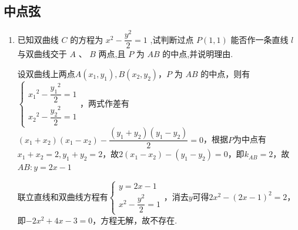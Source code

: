 \subsection*{中点弦}
\begin{enumerate}
    \item 已知双曲线 ${C}$ 的方程为 ${x}^{2} - \dfrac{{y}^{2}}{2} = 1$ ,试判断过点 $P\left( {1,1}\right)$ 能否作一条直线 $l$ 与双曲线交于 $A\text{ 、 }B$ 两点,且 $P$ 为 ${AB}$ 的中点,并说明理由.
    \begin{jieda}
        设双曲线上两点$A(x_1, y_1), B(x_2, y_2)$，$P$ 为 ${AB}$ 的中点，则有$\left\{\begin{array}{l}
             {x_1}^{2} - \dfrac{{y_1}^{2}}{2} = 1  \\
             {x_2}^{2} - \dfrac{{y_2}^{2}}{2} = 1
        \end{array}\right.$，两式作差有$(x_1+x_2)(x_1-x_2) - \dfrac{(y_1+y_2)(y_1-y_2)}{2} = 0$，根据$P$为中点有$x_1+x_2 = 2, y_1+y_2 = 2$，故$2(x_1-x_2) - (y_1-y_2) = 0$，即$k_{AB} = 2$，故$AB: y = 2x-1$

        联立直线和双曲线方程有$\left\{\begin{array}{l}
             y = 2x-1  \\
             {x}^{2} - \dfrac{{y}^{2}}{2} = 1
        \end{array}\right.$，消去$y$可得$2x^2-(2x-1)^2 = 2$，即$-2x^2+4x-3=0$，方程无解，故不存在.
    \end{jieda}


\end{enumerate}
